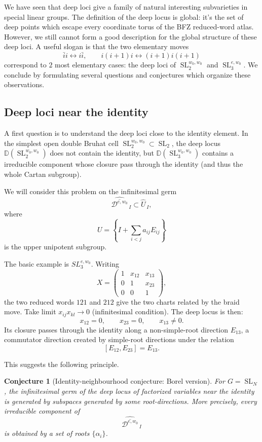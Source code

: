 \documentclass[12pt]{amsart}
\newcommand{\D}{\mathbb D}
\newcommand{\SL}{\operatorname{SL}}
\theoremstyle{plain}
\newtheorem{conjecture}[theorem]{Conjecture}
\theoremstyle{definition}
\theoremstyle{remark}
\begin{document}
We have seen that deep loci give a family of natural interesting subvarieties in special linear groups.  The definition of the deep locus is global: it's the set of deep points which escape every coordinate torus of the BFZ reduced-word atlas. However, we still cannot form a good description for the global structure of these deep loci. A useful slogan is that the two elementary moves
\[
   \bar i i \longleftrightarrow i\bar i,
   \qquad
   i(i+1)i \longleftrightarrow (i+1)i(i+1)
\]
correspond to $2$ most elementary cases: the deep loci of $\SL_2^{w_0,w_0}$ and $\SL_3^{e,w_0}$. We conclude by formulating several questions and conjectures which organize these observations.

\subsection{Deep loci near the identity}

A first question is to understand the deep loci close to the identity element.  In the simplest open double Bruhat cell  \(\SL_2^{w_0,w_0}\subset \SL_2\), the deep locus $\D(\SL_2^{w_0,w_0})$ does not contain the identity, but \(\D(\SL_3^{w_0,w_0})\) contains a irreducible component whose closure pass through the identity (and thus the whole Cartan subgroup).  

We will consider this problem on the infinitesimal germ
\[
   \widehat{\overline{\mathcal D^{e,w_0}}}_{\,I}
   \subset
   \widehat{U}_{\,I},
\]
where
\[
   U=
   \left\{
   I+\sum_{i<j} a_{ij}E_{ij}
   \right\}
\]
is the upper unipotent subgroup.

The basic example is \(SL_3^{e,w_0}\).  Writing
\[
   X=
   \begin{pmatrix}
   1&x_{12}&x_{13}\\
   0&1&x_{23}\\
   0&0&1
   \end{pmatrix},
\]
the two reduced words \(121\) and \(212\) give the two charts related by the braid move.  Take limit $x_{ij}x_{kl} \to 0$ (infinitesimal condition). The deep locus is then:
\[
   x_{12}=0,
   \qquad
   x_{23}=0,
   \qquad
   x_{13}\neq 0.
\]
Its closure passes through the identity along a non-simple-root direction \(E_{13}\), a commutator direction created by simple-root directions under the relation
\[
   [E_{12},E_{23}]=E_{13}.
\]

This suggests the following principle.

\begin{conjecture}[Identity-neighbourhood conjecture: Borel version]
\label{conj:identity-near-deep}
For \(G=\SL_N\), the infinitesimal germ of the deep locus of factorized variables near the identity is generated by subspaces generated by some root-directions.  More precisely, every irreducible component of
\[
   \widehat{\overline{\mathcal D^{e,w_0}}}_{\,I}
\]
is obtained by a set of roots $\{\alpha_i\}$.  \end{conjecture}
\end{document}
